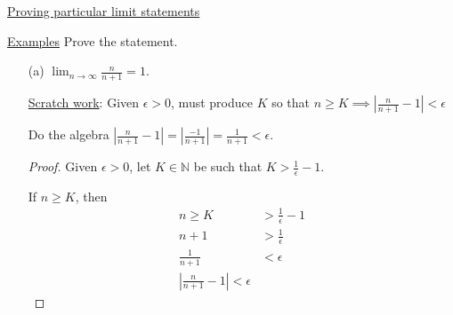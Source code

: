 \documentclass[12pt]{article}
\begin{document}
\underline{Proving particular limit statements}

\underline{Examples} Prove the statement.
\begin{itemize}
\item[(a)] $\lim_{n \to \infty}\frac{n}{n+1} = 1$.

\underline{Scratch work}: Given $\epsilon > 0$, must produce $K$ so that $n \geq K \implies \left|\frac{n}{n + 1} - 1\right| < \epsilon$

Do the algebra $\left|\frac{n}{n + 1} - 1\right| = \left|\frac{-1}{n+1}\right| = \frac{1}{n+1} < \epsilon$.

\begin{proof}
Given $\epsilon > 0$, let $K \in \mathbb{N}$ be such that $K > \frac{1}{\epsilon} - 1$.

If $n \geq K$, then
\begin{align*}
n \geq K &> \frac{1}{\epsilon} - 1\\
n + 1 &> \frac{1}{\epsilon}\\
\frac{1}{n + 1} &< \epsilon \\
\left|\frac{n}{n+1} - 1\right| < \epsilon
\end{align*}
\end{proof}
\end{itemize}
\end{document}
